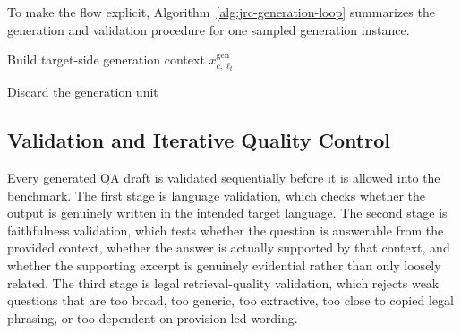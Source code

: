 To make the flow explicit, Algorithm~\ref{alg:jrc-generation-loop} summarizes the generation and validation procedure for one sampled generation instance.

\begin{algorithm}[t]
\caption{Generation and validation loop for one JRC generation instance}
\label{alg:jrc-generation-loop}
\DontPrintSemicolon
{}

Build target-side generation context $x^{\mathrm{gen}}_{c,\ell_t}$\;


Discard the generation unit\;
\end{algorithm}

\subsection{Validation and Iterative Quality Control}

Every generated QA draft is validated sequentially before it is allowed into the benchmark. The first stage is language validation, which checks whether the output is genuinely written in the intended target language. The second stage is faithfulness validation, which tests whether the question is answerable from the provided context, whether the answer is actually supported by that context, and whether the supporting excerpt is genuinely evidential rather than only loosely related. The third stage is legal retrieval-quality validation, which rejects weak questions that are too broad, too generic, too extractive, too close to copied legal phrasing, or too dependent on provision-led wording.

